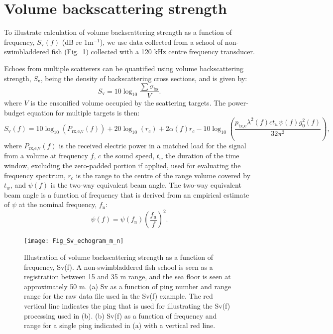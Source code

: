 \documentclass[preprint,12pt,TurnOnLineNumbers]{JASAnew}
\newcommand{\freqsym}{f}
\newcommand{\fn}{f_{\textrm{n}}}
\newcommand{\ptxe}{p_{\textrm{tx,e}}}
\newcommand{\prxevf}{P_{\textrm{rx,e,v}}}
\newcommand{\tslide}{t_w}
\newcommand{\bs}{\sigma_{\textrm{bs}}}
\newcommand{\sv}{S_{\textrm{v}}}
\newcommand{\range}{r}
\newcommand{\gainzero}{g_0}
\newcommand{\eqang}{\psi}
\newcommand{\wlen}{\lambda}
\newcommand{\cw}{c}
\newcommand{\absorp}{\alpha}
\begin{document}
\section{Volume backscattering strength}

To illustrate calculation of volume backscattering strength as a function of frequency,  $\sv(f)$ (dB re 1m$^{-1}$), we use data collected from a school of non-swimbladdered fish (Fig.~\ref{fi:Fig_Sv_echogram}) collected with a 120 kHz centre frequency transducer. 

Echoes from multiple scatterers can be quantified using volume backscattering strength, $\sv$, being the density of backscattering cross sections, and is given by:
%
\begin{equation}
\label{eq:sv}
\sv  =  10\log_{10}\frac{\sum\bs}{V}.
\end{equation}
%
where $V$ is the ensonified volume occupied by the scattering targets. The power-budget equation for multiple targets is then:
%
\begin{equation}
\label{eq:sv_f}
\sv(\freqsym) = 10\log_{10}(\prxevf(\freqsym)) + 20\log_{10}(\range_c) + 2\absorp(\freqsym)\range_c 
- 10\log_{10}\left( \frac{\ptxe \wlen^2(\freqsym) \cw \tslide \eqang(\freqsym) \gainzero^2(\freqsym)}{32\pi^2} \right), 
\end{equation}
%
where $\prxevf(\freqsym)$ is the received electric power in a matched load for the signal from a volume at frequency $\freqsym$, $\cw$ the sound speed, $\tslide$ the duration of the time window, excluding the zero-padded portion if applied, used for evaluating the frequency spectrum, $\range_c$ is the range to the centre of the range volume covered by $\tslide$, and $\eqang(\freqsym)$ is the two-way equivalent beam angle. The two-way equivalent beam angle is a function of frequency that is derived from an empirical estimate of $\eqang$ at the nominal frequency, $\fn$:
\begin{equation}
\label{eq:PsiFc}
\eqang(f) = \eqang(\fn)\left(\frac{\fn}{f}\right)^2.
\end{equation}

\begin{figure}
\texttt{[image: Fig\_Sv\_echogram\_m\_n]}
\caption{\label{fi:Fig_Sv_echogram} Illustration of volume backscattering strength as a function of frequency, Sv(f). A non-swimbladdered fish school is seen as a registration between 15 and 35 m range, and the sea floor is seen at approximately 50 m. (a) Sv as a function of ping number and range range for the raw data file used in the Sv(f) example. The red vertical line indicates the ping that is used for illustrating the Sv(f) processing used in (b). (b) Sv(f) as a function of frequency and range for a single ping indicated in (a) with a vertical red line.}
\end{figure}
\end{document}
